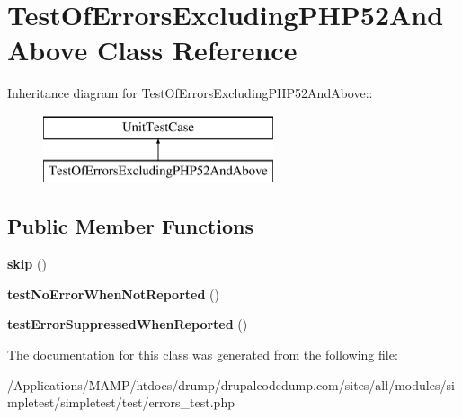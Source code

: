 \hypertarget{class_test_of_errors_excluding_p_h_p52_and_above}{
\section{TestOfErrorsExcludingPHP52AndAbove Class Reference}
\label{class_test_of_errors_excluding_p_h_p52_and_above}
}
Inheritance diagram for TestOfErrorsExcludingPHP52AndAbove::\begin{figure}[H]
\begin{center}
\leavevmode
\includegraphics[height=2cm]{class_test_of_errors_excluding_p_h_p52_and_above}
\end{center}
\end{figure}
\subsection*{Public Member Functions}
\begin{DoxyCompactItemize}
\item 
\hypertarget{class_test_of_errors_excluding_p_h_p52_and_above_ad34a9fece897cfe133d8f3795e63bbc0}{
{\bfseries skip} ()}
\label{class_test_of_errors_excluding_p_h_p52_and_above_ad34a9fece897cfe133d8f3795e63bbc0}

\item 
\hypertarget{class_test_of_errors_excluding_p_h_p52_and_above_af72dc015dc41379f46f72fa121790526}{
{\bfseries testNoErrorWhenNotReported} ()}
\label{class_test_of_errors_excluding_p_h_p52_and_above_af72dc015dc41379f46f72fa121790526}

\item 
\hypertarget{class_test_of_errors_excluding_p_h_p52_and_above_a682f576882ca9df4dd2e12221fdbd530}{
{\bfseries testErrorSuppressedWhenReported} ()}
\label{class_test_of_errors_excluding_p_h_p52_and_above_a682f576882ca9df4dd2e12221fdbd530}

\end{DoxyCompactItemize}


The documentation for this class was generated from the following file:\begin{DoxyCompactItemize}
\item 
/Applications/MAMP/htdocs/drump/drupalcodedump.com/sites/all/modules/simpletest/simpletest/test/errors\_\-test.php\end{DoxyCompactItemize}

